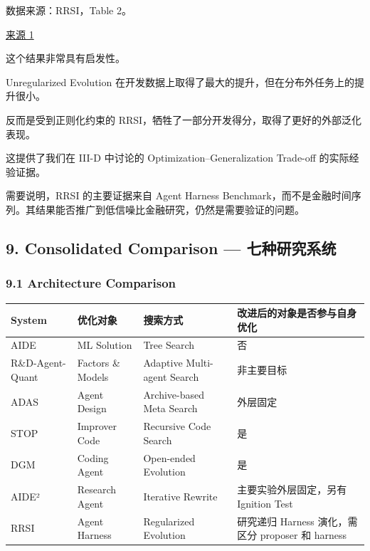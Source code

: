 数据来源：RRSI，Table 2。

\href{https://arxiv.org/html/2609.24972v1}{来源 1}

这个结果非常具有启发性。

Unregularized Evolution 在开发数据上取得了最大的提升，但在分布外任务上的提升很小。

反而是受到正则化约束的 RRSI，牺牲了一部分开发得分，取得了更好的外部泛化表现。

这提供了我们在 III-D 中讨论的 Optimization--Generalization Trade-off 的实际经验证据。

需要说明，RRSI 的主要证据来自 Agent Harness Benchmark，而不是金融时间序列。其结果能否推广到低信噪比金融研究，仍然是需要验证的问题。

\hypertarget{part-3-44-0001-consolidated-comparison-ux4e03ux79cdux7814ux7a76ux7cfbux7edf}{%
\subsection{9. Consolidated Comparison --- 七种研究系统}\label{part-3-44-0001-consolidated-comparison-ux4e03ux79cdux7814ux7a76ux7cfbux7edf}}

\hypertarget{part-3-44-0001-architecture-comparison}{%
\subsubsection{9.1 Architecture Comparison}\label{part-3-44-0001-architecture-comparison}}

\begin{readertable}
\begin{longtable}[]{@{}
  >{\raggedright\arraybackslash}p{}
  >{\raggedright\arraybackslash}p{}
  >{\raggedright\arraybackslash}p{}
  >{\raggedright\arraybackslash}p{}@{}}
\toprule
System & 优化对象 & 搜索方式 & 改进后的对象是否参与自身优化 \\
\midrule
\endhead
AIDE & ML Solution & Tree Search & 否 \\
R\&D-Agent-Quant & Factors \& Models & Adaptive Multi-agent Search & 非主要目标 \\
ADAS & Agent Design & Archive-based Meta Search & 外层固定 \\
STOP & Improver Code & Recursive Code Search & 是 \\
DGM & Coding Agent & Open-ended Evolution & 是 \\
AIDE² & Research Agent & Iterative Rewrite & 主要实验外层固定，另有 Ignition Test \\
RRSI & Agent Harness & Regularized Evolution & 研究递归 Harness 演化，需区分 proposer 和 harness \\
\bottomrule
\end{longtable}
\end{readertable}


